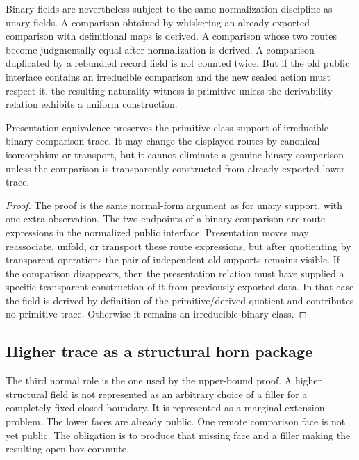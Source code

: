 Binary fields are nevertheless subject to the same normalization discipline as unary fields.
A comparison obtained by whiskering an already exported comparison with definitional maps
is derived.  A comparison whose two routes become judgmentally equal after normalization is
derived.  A comparison duplicated by a rebundled record field is not counted twice.  But if
the old public interface contains an irreducible comparison and the new sealed action must
respect it, the resulting naturality witness is primitive unless the derivability relation
exhibits a uniform construction.

\begin{lemma}
Presentation equivalence preserves the primitive-class support of irreducible binary
comparison trace.  It may change the displayed routes by canonical isomorphism or transport,
but it cannot eliminate a genuine binary comparison unless the comparison is transparently
constructed from already exported lower trace.
\end{lemma}

\begin{proof}
The proof is the same normal-form argument as for unary support, with one extra observation.
The two endpoints of a binary comparison are route expressions in the normalized public
interface.  Presentation moves may reassociate, unfold, or transport these route expressions,
but after quotienting by transparent operations the pair of independent old supports remains
visible.  If the comparison disappears, then the presentation relation must have supplied a
specific transparent construction of it from previously exported data.  In that case the field
is derived by definition of the primitive/derived quotient and contributes no primitive trace.
Otherwise it remains an irreducible binary class.
\end{proof}

\subsection{Higher trace as a structural horn package}

The third normal role is the one used by the upper-bound proof.  A higher structural field is
not represented as an arbitrary choice of a filler for a completely fixed closed boundary.  It
is represented as a marginal extension problem.  The lower faces are already public.  One
remote comparison face is not yet public.  The obligation is to produce that missing face and
a filler making the resulting open box commute.

